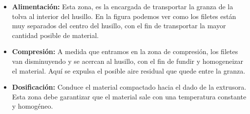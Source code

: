\begin{itemize}
        \begin{itemize}
                \item \textbf{Alimentación:} Esta zona, es la encargada de transportar la granza de la tolva al interior del husillo. En la figura podemos ver como los filetes están muy separados del centro del husillo, con el fin de transportar la mayor cantidad posible de material.
                \item \textbf{Compresión:} A medida que entramos en la zona de compresión, los filetes van disminuyendo y se acercan al husillo, con el fin de fundir y homogeneizar el material. Aquí se expulsa el posible aire residual que quede entre la granza.
                \item \textbf{Dosificación:} Conduce el material compactado hacia el dado de la extrusora. Esta zona debe garantizar que el material sale con una temperatura constante y homogéneo.
        \end{itemize}


\end{itemize}
